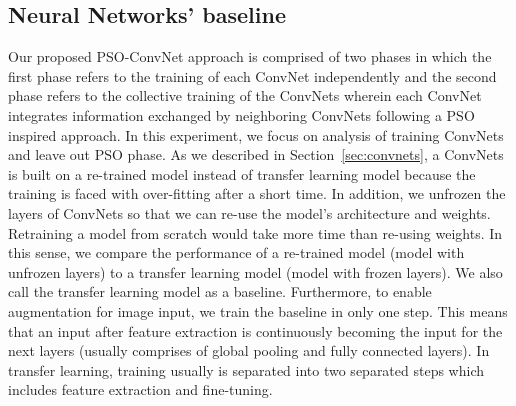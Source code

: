 \documentclass{ieeeaccess}
\begin{document}
\subsection{Neural Networks' baseline}
\label{neuralnetworks_baseline}
Our proposed PSO-ConvNet approach is comprised of two phases in which the first phase refers to the training of each ConvNet independently and the second phase refers to the collective training of the ConvNets wherein each ConvNet integrates information exchanged by neighboring ConvNets following a PSO inspired approach. In this experiment, we focus on analysis of training ConvNets and leave out PSO phase. As we described in Section~\ref{sec:convnets}, a ConvNets is built on a re-trained model instead of transfer learning model because the training is faced with over-fitting after a short time. In addition, we unfrozen the layers of ConvNets so that we can re-use the model's architecture and weights. Retraining a model from scratch would take more time than re-using weights. In this sense, we compare the performance of a re-trained model (model with unfrozen layers) to a transfer learning model (model with frozen layers). We also call the transfer learning model as a baseline. Furthermore, to enable augmentation for image input, we train the baseline in only one step. This means that an input after feature extraction is continuously becoming the input for the next layers (usually comprises of global pooling and fully connected layers). In transfer learning, training usually is separated into two separated steps which includes feature extraction and fine-tuning.
\end{document}
